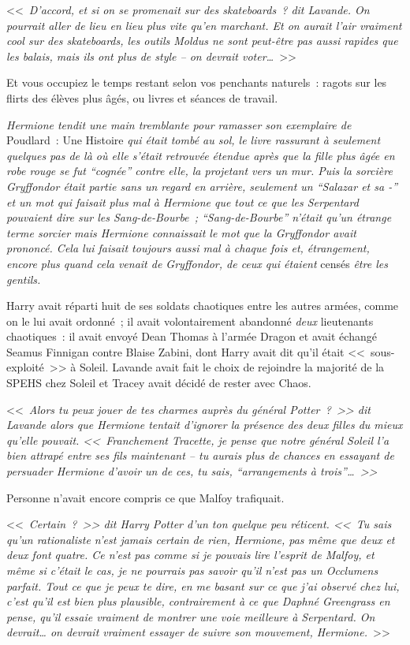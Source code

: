 <<~\emph{D'accord, et si on se promenait sur des skateboards~? dit Lavande. On pourrait aller de lieu en lieu plus vite qu'en marchant. Et on aurait l'air vraiment cool sur des skateboards, les outils Moldus ne sont peut-être pas aussi rapides que les balais, mais ils ont plus de style -- on devrait voter…}~>>

Et vous occupiez le temps restant selon vos penchants naturels~: ragots sur les flirts des élèves plus âgés, ou livres et séances de travail.

\emph{Hermione tendit une main tremblante pour ramasser son exemplaire de} Poudlard~: Une Histoire \emph{qui était tombé au sol, le livre rassurant à seulement quelques pas de là où elle s'était retrouvée étendue après que la fille plus âgée en robe rouge se fut “cognée” contre elle, la projetant vers un mur. Puis la sorcière Gryffondor était partie sans un regard en arrière, seulement un “Salazar et sa -” et un mot qui faisait plus mal à Hermione que tout ce que les Serpentard pouvaient dire sur les Sang-de-Bourbe~; “Sang-de-Bourbe” n'était qu'un étrange terme sorcier mais Hermione connaissait le mot que la Gryffondor avait prononcé. Cela lui faisait toujours aussi mal à chaque fois et, étrangement, encore plus quand cela venait de Gryffondor, de ceux qui étaient} censés \emph{être les gentils.}

Harry avait réparti huit de ses soldats chaotiques entre les autres armées, comme on le lui avait ordonné~; il avait volontairement abandonné \emph{deux} lieutenants chaotiques~: il avait envoyé Dean Thomas à l'armée Dragon et avait échangé Seamus Finnigan contre Blaise Zabini, dont Harry avait dit qu'il était <<~sous-exploité~>> à Soleil. Lavande avait fait le choix de rejoindre la majorité de la SPEHS chez Soleil et Tracey avait décidé de rester avec Chaos.

<<~\emph{Alors tu peux jouer de tes charmes auprès du général Potter~?~>> dit Lavande alors que Hermione tentait d'ignorer la présence des deux filles du mieux qu'elle pouvait. <<~Franchement Tracette, je pense que notre général Soleil l'a bien attrapé entre ses fils maintenant -- tu aurais plus de chances en essayant de persuader Hermione d'avoir un de ces, tu sais, “arrangements à trois”…~>>}

Personne n'avait encore compris ce que Malfoy trafiquait.

<<~\emph{Certain~?~>> dit Harry Potter d'un ton quelque peu réticent. <<~Tu sais qu'un rationaliste n'est jamais certain de rien, Hermione, pas même que deux et deux font quatre. Ce n'est pas comme si je pouvais lire l'esprit de Malfoy, et même si c'était le cas, je ne pourrais pas savoir qu'il n'est pas un Occlumens parfait. Tout ce que je peux te dire, en me basant sur ce que j'ai observé chez lui, c'est qu'il est bien plus plausible, contrairement à ce que Daphné Greengrass en pense, qu'il essaie vraiment de montrer une voie meilleure à Serpentard. On devrait… on devrait vraiment essayer de suivre son mouvement, Hermione.}~>>

